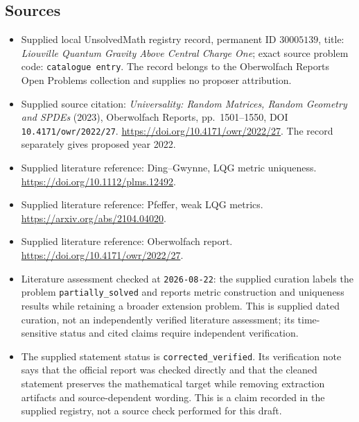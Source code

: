 \documentclass[11pt]{article}
\begin{document}
\subsection{Sources}
\begin{itemize}
\item Supplied local UnsolvedMath registry record, permanent ID \(30005139\), title: \emph{Liouville Quantum Gravity Above Central Charge One}; exact source problem code: \texttt{catalogue entry}. The record belongs to the Oberwolfach Reports Open Problems collection and supplies no proposer attribution.
\item Supplied source citation: \emph{Universality: Random Matrices, Random Geometry and SPDEs} (2023), Oberwolfach Reports, pp.\ 1501--1550, DOI \texttt{10.4171/owr/2022/27}. \url{https://doi.org/10.4171/owr/2022/27}. The record separately gives proposed year 2022.
\item Supplied literature reference: Ding--Gwynne, LQG metric uniqueness. \url{https://doi.org/10.1112/plms.12492}.
\item Supplied literature reference: Pfeffer, weak LQG metrics. \url{https://arxiv.org/abs/2104.04020}.
\item Supplied literature reference: Oberwolfach report. \url{https://doi.org/10.4171/owr/2022/27}.
\item Literature assessment checked at \texttt{2026-08-22}: the supplied curation labels the problem \texttt{partially\_solved} and reports metric construction and uniqueness results while retaining a broader extension problem. This is supplied dated curation, not an independently verified literature assessment; its time-sensitive status and cited claims require independent verification.
\item The supplied statement status is \texttt{corrected\_verified}. Its verification note says that the official report was checked directly and that the cleaned statement preserves the mathematical target while removing extraction artifacts and source-dependent wording. This is a claim recorded in the supplied registry, not a source check performed for this draft.
\end{itemize}
\end{document}
